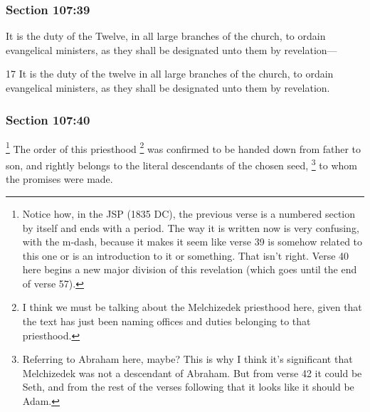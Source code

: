 	\subsubsection{Section 107:39} %
		\label{DC107-39}

		It is the duty of the Twelve, in all large branches of the church, to ordain evangelical ministers, as they shall be designated unto them by revelation---

		\begin{framed}
		\scriptsize
			\begin{compactdesc}
				\item[JSP] 17 It is the duty of the twelve in all large branches of the church, to ordain evangelical ministers, as they shall be designated unto them by revelation.
			\end{compactdesc}
		\end{framed}

	\subsubsection{Section 107:40} %
		\label{DC107-40}

			\footnote{%
				Notice how, in the JSP (1835 DC), the previous verse is a numbered section by itself and ends with a period. The way it is written now is very confusing, with the m-dash, because it makes it seem like verse 39 is somehow related to this one or is an introduction to it or something. That isn't right. Verse 40 here begins a new major division of this revelation (which goes until the end of verse 57).
				}%
		The order of this priesthood%
			\footnote{%
				I think we must be talking about the Melchizedek priesthood here, given that the text has just been naming offices and duties belonging to that priesthood.
				}
		was confirmed to be handed down from father to son, and rightly belongs to the literal descendants of the chosen seed,%
			\footnote{%
				Referring to Abraham here, maybe? This is why I think it's significant that Melchizedek was not a descendant of Abraham. But from verse 42 it could be Seth, and from the rest of the verses following that it looks like it should be Adam.
				}
		to whom the promises were made.



